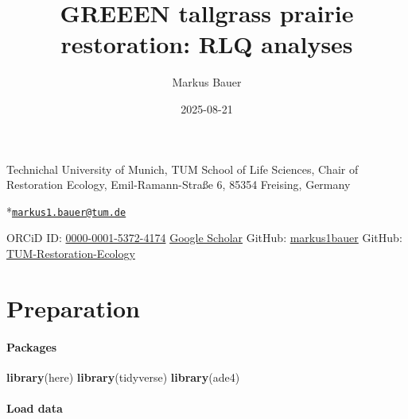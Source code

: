 \documentclass[
]{article}
\title{GREEEN tallgrass prairie restoration: RLQ analyses}
\author{Markus Bauer}
\date{2025-08-21}
\newenvironment{Shaded}{\begin{snugshade}}{\end{snugshade}}
\newcommand{\FunctionTok}[1]{\textcolor[rgb]{0.13,0.29,0.53}{\textbf{#1}}}
\newcommand{\NormalTok}[1]{#1}
\begin{document}
\maketitle

{
\setcounter{tocdepth}{3}
\tableofcontents
}
Technichal University of Munich, TUM School of Life Sciences, Chair of
Restoration Ecology, Emil-Ramann-Straße 6, 85354 Freising, Germany

*\href{mailto:markus1.bauer@tum.de}{\nolinkurl{markus1.bauer@tum.de}}

ORCiD ID:
\href{https://orcid.org/0000-0001-5372-4174}{0000-0001-5372-4174}
\href{https://scholar.google.de/citations?user=oHhmOkkAAAAJ&hl=de&oi=ao}{Google
Scholar} GitHub: \href{https://github.com/markus1bauer}{markus1bauer}
GitHub:
\href{https://github.com/TUM-Restoration-Ecology}{TUM-Restoration-Ecology}

\section{Preparation}\label{preparation}

\paragraph{Packages}\label{packages}

\begin{Shaded}
\begin{Highlighting}[]
\FunctionTok{library}\NormalTok{(here)}
\FunctionTok{library}\NormalTok{(tidyverse)}
\FunctionTok{library}\NormalTok{(ade4)}
\end{Highlighting}
\end{Shaded}

\paragraph{Load data}\label{load-data}
\end{document}
